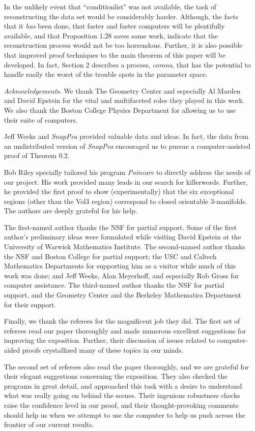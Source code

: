 In the unlikely event that  ``conditionlist" was not available, the task of 
reconstructing the data set would be considerably harder.  Although, the 
facts that it {\it has} been done, that faster and faster computers will be 
plentifully available, and that Proposition 1.28 saves some work, indicate 
that the reconstruction process would not be too horrendous.  Further, it is 
also possible that improved proof techniques to the main theorem of this 
paper will be developed.  In fact, Section 2 describes a process, {\it corona}, 
that has the potential to handle easily  the worst of the trouble spots in the 
parameter space.
 
 \pagebreak
{\it Acknowledgements}.  We thank The Geometry Center and
especially Al Marden and David Epstein for the vital and multifaceted roles
they played in  this work.   We also thank the Boston College Physics 
Department for allowing us to use their suite of computers.

Jeff Weeks and {\it SnapPea} provided  valuable data and
ideas.  In
fact, the data from an undistributed version of
{\it SnapPea} encouraged us to pursue a computer-assisted proof of Theorem 
0.2.  

Bob Riley specially tailored his program
{\it Poincar{\rm \'{\it e}}}
to directly address the needs of our project.  His work provided
many leads in our search for
killerwords.  Further, he provided the first proof to show (experimentally) 
that the six
exceptional regions (other than the Vol3 region) correspond to
closed orientable $3$-manifolds.  The authors are deeply grateful for his
help. 

The first-named author thanks
the NSF for partial support.  Some of the first author's preliminary ideas
were formulated while visiting
David Epstein at the University of Warwick Mathematics Institute.  The
second-named author thanks the NSF and Boston College for
partial support; the USC and Caltech Mathematics Departments for 
supporting
him as a visitor while much of
this work was done; and Jeff Weeks, Alan  Meyerhoff, and especially Rob
Gross for computer assistance.  The
third-named author thanks the NSF for partial support, and the Geometry 
Center and the Berkeley Mathematics Department for their support. 

Finally, we thank the referees for the magnificent job they did.  The first set 
of referees read our paper thoroughly and made numerous excellent 
suggestions for improving the exposition.  Further, their discussion of issues 
related to computer-aided proofs crystallized many of these topics in our 
minds.

The second set of referees also read the paper thoroughly, and we are 
grateful for their elegant suggestions concerning the exposition. 
They also checked the programs in great detail, and approached this task 
with a desire to understand what was really going on behind the scenes.  
Their ingenious robustness checks raise the confidence level in our proof, 
and their thought-provoking comments should help us when we attempt to 
use the computer to help us push across the frontier of our current results.
 






